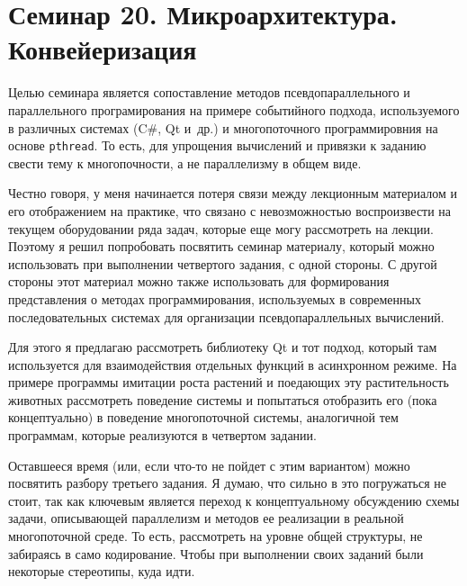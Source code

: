 \chapter[20]{Семинар 20. Микроархитектура. Конвейеризация}

Целью семинара является сопоставление методов псевдопараллельного и параллельного програмирования на примере событийного подхода, используемого в различных системах (C\#, Qt и~др.) и многопоточного программировния на основе \texttt{pthread}. То есть, для упрощения вычислений и привязки к заданию свести тему к многопочности, а не параллелизму в общем виде.

Честно говоря, у меня начинается потеря связи между лекционным материалом и его отображением на практике, что связано с невозможностью воспроизвести на текущем оборудовании ряда задач, которые еще могу рассмотреть на лекции. Поэтому я решил попробовать посвятить семинар материалу, который можно использовать при выполнении четвертого задания, с одной стороны. С другой стороны этот материал можно также использовать для формирования представления о методах программирования, используемых в современных последовательных системах для организации псевдопараллельных вычислений.

Для этого я предлагаю рассмотреть библиотеку Qt и тот подход, который там используется для взаимодействия отдельных функций в асинхронном режиме. На примере программы имитации роста растений и поедающих эту растительность животных рассмотреть поведение системы и попытаться отобразить его (пока концептуально) в поведение многопоточной системы, аналогичной тем программам, которые реализуются в четвертом задании.

Оставшееся время (или, если что-то не пойдет с этим вариантом) можно посвятить разбору третьего задания. Я думаю, что сильно в это погружаться не стоит, так как ключевым является переход к концептуальному обсуждению схемы задачи, описывающей параллелизм и методов ее реализации в реальной многопоточной среде. То есть, рассмотреть на уровне общей структуры, не забираясь в само кодирование. Чтобы при выполнении своих заданий были некоторые стереотипы, куда идти.

